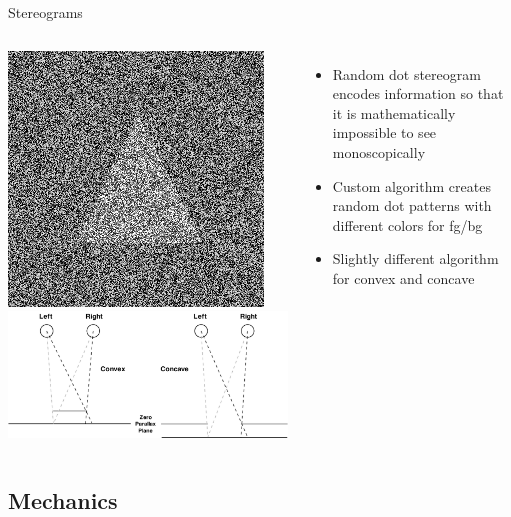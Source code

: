 \documentclass[12pt,ucs,hyperref={pdftext}]{beamer}
\newlength{\columnleft}
\newlength{\columnright}
\begin{document}
\begin{frame}{Stereograms}
\begin{columns}

\column{\columnleft}
\begin{center}
\includegraphics[scale=0.25]{screenshots/rds_example.png}\\
\includegraphics[scale=0.25]{media/rds.pdf}\\
\end{center}

\column{\columnright}
\begin{itemize}%
\item Random dot stereogram encodes information so that it is mathematically impossible to see monoscopically
\item Custom algorithm creates random dot patterns with different colors for fg/bg
\item Slightly different algorithm for convex and concave
\end{itemize}

\end{columns}
\end{frame}


\subsection{Mechanics}
\end{document}
